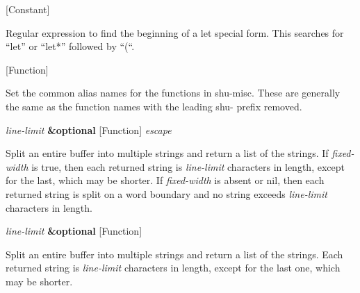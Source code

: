 \vspace{1em}
\noindent
{}
\usebox{\funcname}
 \hfill [Constant]

\begin{doc-string}
Regular expression to find the beginning of a let special form.
This searches for ``let'' or ``let*'' followed by ``(``.
\end{doc-string}

\vspace{1em}
\noindent
{}
\usebox{\funcname}
 \hfill [Function]

\begin{doc-string}
Set the common alias names for the functions in shu-misc.
These are generally the same as the function names with the leading
shu- prefix removed.
\end{doc-string}

\vspace{1em}
\noindent
{}
\usebox{\funcname}\emph{line-limit} \textbf{\&optional}
 \hfill [Function]
\hspace*{\wd\funcname}\emph{escape}

\begin{doc-string}
Split an entire buffer into multiple strings and return a list of the
strings.  If \emph{fixed-width} is true, then each returned string is \emph{line-limit}
characters in length, except for the last, which may be shorter.  If \emph{fixed-width}
is absent or nil, then each returned string is split on a word boundary and no
string exceeds \emph{line-limit} characters in length.
\end{doc-string}

\vspace{1em}
\noindent
{}
\usebox{\funcname}\emph{line-limit} \textbf{\&optional}
 \hfill [Function]
\hspace*{\wd\funcname}

\begin{doc-string}
Split an entire buffer into multiple strings and return a list of the
strings.  Each returned string is \emph{line-limit} characters in length, except for
the last one, which may be shorter.
\end{doc-string}

